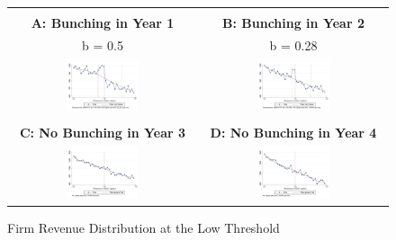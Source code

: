 \begin{figure}[t]
\caption{Firm Revenue Distribution at the Low Threshold}

\label{fig:LowestThreshold} 
\begin{centering}
\begin{tabular}{cc}
\vspace{0.2cm}
  & \vspace{0.2cm}
 \tabularnewline
\textbf{A: Bunching in Year 1}  & \textbf{B: Bunching in Year 2}\tabularnewline
b = 0.5  & b = 0.28\tabularnewline
\includegraphics[width=0.4\textwidth]{graphs/BunchingYear1_1Million_Degree4_30000}  & \includegraphics[width=0.4\textwidth]{graphs/BunchingYear2_1Million_Degree4_30000}\tabularnewline
\vspace{0.2cm}
  & \vspace{0.2cm}
 \tabularnewline
\textbf{C: No Bunching in Year 3}  & \textbf{D: No Bunching in Year 4}\tabularnewline
\includegraphics[width=0.4\textwidth]{graphs/BunchingYear3_1Million_Degree4_30000}  & \includegraphics[width=0.4\textwidth]{graphs/BunchingYear4_1Million_Degree4_30000}\tabularnewline

\end{tabular}
\end{centering}
\end{figure}
